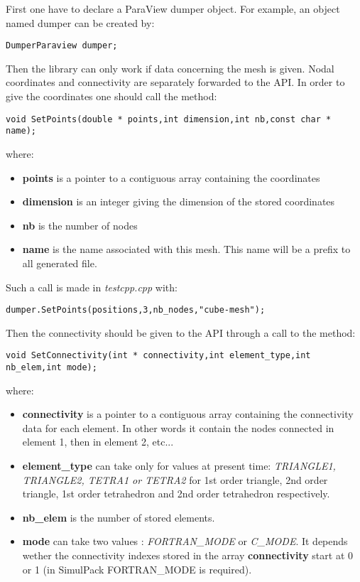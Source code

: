 \noindent First one have to declare a ParaView dumper object. For example, an object named dumper can be
created by:
\begin{lstlisting}[frame=tb,backgroundcolor=\color{white}]
DumperParaview dumper;
\end{lstlisting}
Then the library can only work if data concerning the mesh is given. Nodal coordinates and connectivity 
are separately forwarded to the API. In order to give the coordinates one should call the method:
\begin{lstlisting}[frame=tbrl]
void SetPoints(double * points,int dimension,int nb,const char * name);
\end{lstlisting}
where:
\begin{itemize}
\item {\bf points} is a pointer to a contiguous array containing the coordinates
\item {\bf dimension} is an integer giving the dimension of the stored coordinates
\item {\bf nb} is the number of nodes
\item {\bf name} is the name associated with this mesh. This name will be a prefix to all generated file. \\
\end{itemize}

Such a call is made in {\it testcpp.cpp} with:
\begin{lstlisting}[frame=tb,backgroundcolor=\color{white}]
dumper.SetPoints(positions,3,nb_nodes,"cube-mesh");
\end{lstlisting}
Then the connectivity should be given to the API through a call to the method:
\begin{lstlisting}[frame=tbrl]
void SetConnectivity(int * connectivity,int element_type,int nb_elem,int mode);
\end{lstlisting}
where: 
\begin{itemize}
\item {\bf connectivity} is a pointer to a contiguous array containing the connectivity data for 
each element. In other words it contain the nodes connected in element 1, then in element 2, etc...
\item {\bf element\_type} can take only for values at present time: {\it TRIANGLE1, TRIANGLE2, TETRA1 or TETRA2}
for 1st order triangle, 2nd order triangle, 1st order tetrahedron and 2nd order tetrahedron respectively.
\item {\bf nb\_elem} is the number of stored elements.
\item {\bf mode} can take two values : {\it FORTRAN\_MODE} or {\it C\_MODE}. It depends wether the connectivity indexes 
stored in the array {\bf connectivity} start at 0 or 1  (in SimulPack FORTRAN\_MODE is required).\\
\end{itemize}

